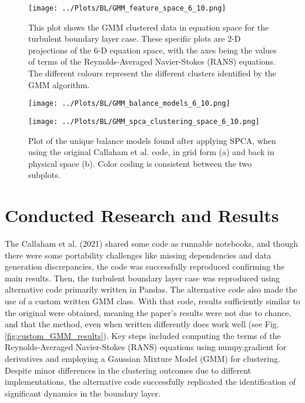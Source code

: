 \documentclass[12pt]{report} %
\begin{document}
\begin{figure}[h]
  \centering
  \texttt{[image: ../Plots/BL/GMM\_feature\_space\_6\_10.png]}
  \caption{This plot shows the GMM clustered data in equation space for the turbulent boundary layer case. These specific plots are 2-D projections of the 6-D equation space, with the axes being the values of terms of the Reynolds-Averaged Navier-Stokes (RANS) equations. The different colours represent the different clusters identified by the GMM algorithm.}
  \label{fig:EquationSpace}
\end{figure}

\begin{figure}[htbp]
  \centering
  \begin{minipage}[b]{0.6\textwidth}
      \centering
      \texttt{[image: ../Plots/BL/GMM\_balance\_models\_6\_10.png]}
      \subcaption{}
  \end{minipage}

  \begin{minipage}[b]{0.6\textwidth}
      \centering
      \texttt{[image: ../Plots/BL/GMM\_spca\_clustering\_space\_6\_10.png]}
      \subcaption{}
  \end{minipage}

  \caption{Plot of the unique balance models found after applying SPCA, when using the original Callaham et al. code, in grid form (a) and back in physical space (b). Color coding is consistent between the two subplots.}
  \label{fig:GMM_results}
\end{figure}


\section{Conducted Research and Results}

The Callaham et al. (2021) shared some code as runnable notebooks, and though there were some portability challenges like missing dependencies and data generation discrepancies, the code was successfully reproduced confirming the main results. Then, the turbulent boundary layer case was reproduced using alternative code primarily written in Pandas. The alternative code also made the use of a custom written GMM class. With that code, results sufficiently similar to the original were obtained, meaning the paper's results were not due to chance, and that the method, even when written differently does work well (see Fig. \ref{fig:custom_GMM_results}). Key steps included computing the terms of the Reynolds-Averaged Navier-Stokes (RANS) equations using numpy.gradient for derivatives and employing a Gaussian Mixture Model (GMM) for clustering. Despite minor differences in the clustering outcomes due to different implementations, the alternative code successfully replicated the identification of significant dynamics in the boundary layer.
\end{document}

